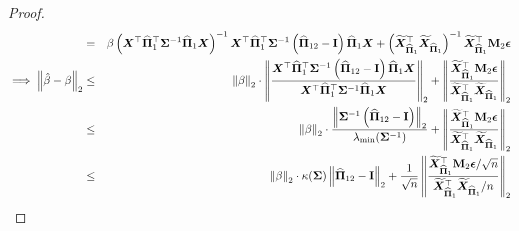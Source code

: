 \documentclass[numsec,webpdf,modern,medium,namedate]{oup-authoring-template}
\theoremstyle{thmstyleone}%
\theoremstyle{thmstyletwo}%
\theoremstyle{thmstylethree}%
\begin{document}
\begin{proof}
{\begin{eqnarray}
& = & \beta \left(\bX^\top {\hatPi_1}^\top \bSigma^{-1} {\hatPi_1} \bX\right)^{-1} \bX^\top {\hatPi_1}^\top \bSigma^{-1} \left(\hatPi_{12}- \bI\right) {\hatPi_1} \bX + \left(\widetilde{\bX}_{\hatPi_1}^\top  \widetilde{\bX}_{\hatPi_1}\right)^{-1} \widetilde{\bX}_{\hatPi_1}^\top \bM_2 \beps\notag\\
\implies \norm{\hat{\beta} - \beta}_2 & \leq & \norm{\beta}_2\cdot \norm{\dfrac{\bX^\top {\hatPi_1}^\top \bSig^{-1} \left(\hatPi_{12} - \bI\right) {\hatPi_1} \bX}{\bX^\top {\hatPi_1}^\top \bSig^{-1} {\hatPi_1} \bX}}_2 + \norm{\dfrac{\widetilde{\bX}_{\hatPi_1}^\top \bM_2 \beps}{\widetilde{\bX}_{\hatPi_1}^\top  \widetilde{\bX}_{\hatPi_1}}}_2\notag\\
& \leq & \norm{\beta}_2\cdot \dfrac{\norm{\bSigma^{-1} \left(\hatPi_{12}- \bI\right)}_2}{\lambda_{\min}(\Siginv)} + \norm{\dfrac{\widetilde{\bX}_{\hatPi_1}^\top \bM_2 \beps}{\widetilde{\bX}_{\hatPi_1}^\top  \widetilde{\bX}_{\hatPi_1}}}_2\notag\\
& \leq & \norm{\beta}_2\cdot \kappa(\bSig)\norm{\hatPi_{12}- \bI}_2 + \dfrac{1}{\sqrt{n}}\norm{\dfrac{\widetilde{\bX}_{\hatPi_1}^\top \bM_2 \beps/\sqrt{n}}{\widetilde{\bX}_{\hatPi_1}^\top  \widetilde{\bX}_{\hatPi_1}/n}}_2
\end{eqnarray}}


\end{proof}
\end{document}
